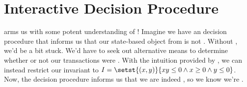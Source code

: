 \section{Interactive \Iconfluence{} Decision Procedure}
 arms us with some potent understanding of
\Iconfluence! Imagine we have an \Iclosed{} decision procedure that informs us
that our state-based object from  is not
\Iclosed{}. Without , we'd be a bit stuck. We'd
have to seek out alternative means to determine whether or not our transactions
were \Iconfluent{}. With the intuition provided by
, we can instead restrict our invariant to $I =
\setst{(x, y)}{xy \leq 0 \land x \geq 0 \land y \leq 0}$. Now, the \Iclosed{}
decision procedure informs us that we are indeed \Iclosed{}, so we know we're
\Iconfluent{}.

